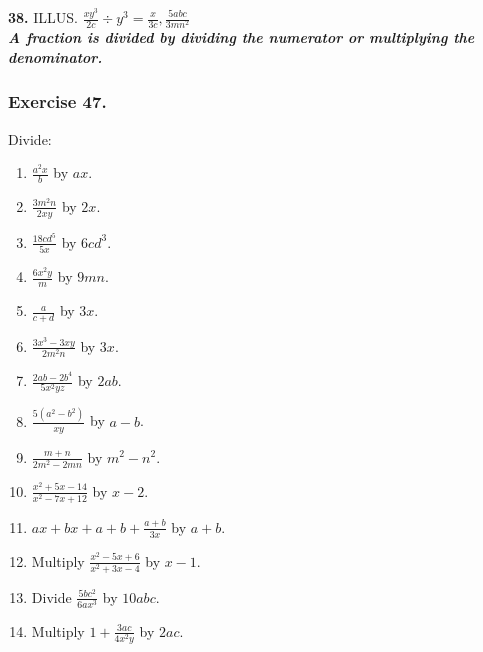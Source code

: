 \documentclass{book}
\begin{document}
\textbf{ 38.} ILLUS. $\displaystyle \frac{xy^3}{2c}\div y^3=\frac{x}{3c}, \frac{5abc}{3mn^2}$\\

\textbf{ \textit{ A fraction is divided by dividing the numerator
or multiplying the denominator.\footnotemark}}

\subsubsection*{Exercise 47.}

Divide:

\begin{enumerate}
\item $\displaystyle \frac{a^2x}{b}$ by $ax$.

\item $\displaystyle \frac{3m^2n}{2xy}$ by $2x$.

\item $\displaystyle \frac{18cd^5}{5x}$ by $6cd^3$.

\item $\displaystyle \frac{6x^2y}{m}$ by $9mn$.

\item $\displaystyle \frac{a}{c+d}$ by $3x$.

\item $\displaystyle \frac{3x^3-3xy}{2m^2n}$ by $3x$.

\item $\displaystyle \frac{2ab-2b^4}{5x^2yz}$ by $2ab$.

\item $\displaystyle \frac{5(a^2-b^2)}{xy}$ by $a-b$.

\item $\displaystyle \frac{m+n}{2m^2-2mn}$ by $m^2-n^2$.

\item $\displaystyle \frac{x^2+5x-14}{x^2-7x+12}$ by $x-2$.

\item $\displaystyle ax+bx+a+b+\frac{a+b}{3x}$ by $a+b$.

\item Multiply $\displaystyle \frac{x^2-5x+6}{x^2+3x-4}$ by $x-1$.


\item Divide $\displaystyle  \frac {5 b c^2}{6 a x^3} $ by $10 a b
c$.

\item Multiply $\displaystyle  1 + \frac{3ac}{4 x^2 y} $ by $ 2 a
c $.


\end{enumerate}
\end{document}
